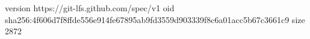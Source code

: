 version https://git-lfs.github.com/spec/v1
oid sha256:4f606d7f8ffde556e914fe67895ab9fd3559d903339f8c6a01acc5b67c3661c9
size 2872
